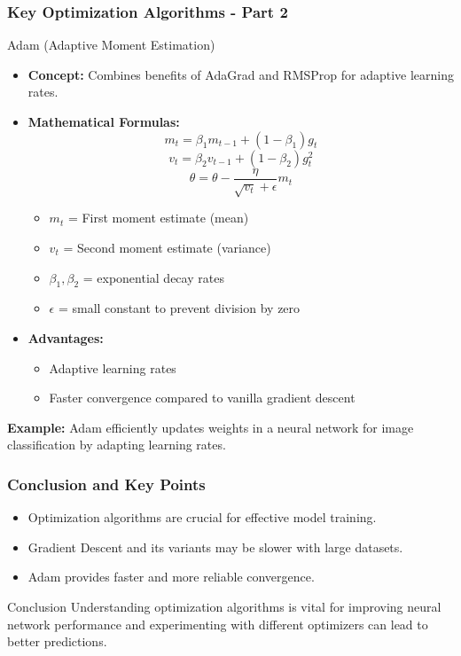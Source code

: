 \documentclass[aspectratio=169]{beamer}
\begin{document}
\begin{frame}[fragile]
    \frametitle{Key Optimization Algorithms - Part 2}
    \begin{block}{Adam (Adaptive Moment Estimation)}
        \begin{itemize}
            \item \textbf{Concept:} Combines benefits of AdaGrad and RMSProp for adaptive learning rates.
            \item \textbf{Mathematical Formulas:}
            \begin{equation}
                m_t = \beta_1 m_{t-1} + (1 - \beta_1) g_t
            \end{equation}
            \begin{equation}
                v_t = \beta_2 v_{t-1} + (1 - \beta_2) g_t^2
            \end{equation}
            \begin{equation}
                \theta = \theta - \frac{\eta}{\sqrt{v_t} + \epsilon} m_t
            \end{equation}
            \begin{itemize}
                \item $m_t$ = First moment estimate (mean)
                \item $v_t$ = Second moment estimate (variance)
                \item $\beta_1, \beta_2$ = exponential decay rates
                \item $\epsilon$ = small constant to prevent division by zero
            \end{itemize}
            \item \textbf{Advantages:}
            \begin{itemize}
                \item Adaptive learning rates
                \item Faster convergence compared to vanilla gradient descent
            \end{itemize}
        \end{itemize}
        \textbf{Example:} Adam efficiently updates weights in a neural network for image classification by adapting learning rates.
    \end{block}
\end{frame}

\begin{frame}[fragile]
    \frametitle{Conclusion and Key Points}
    \begin{itemize}
        \item Optimization algorithms are crucial for effective model training.
        \item Gradient Descent and its variants may be slower with large datasets.
        \item Adam provides faster and more reliable convergence.
    \end{itemize}
    \begin{block}{Conclusion}
        Understanding optimization algorithms is vital for improving neural network performance and experimenting with different optimizers can lead to better predictions.
    \end{block}
\end{frame}
\end{document}

